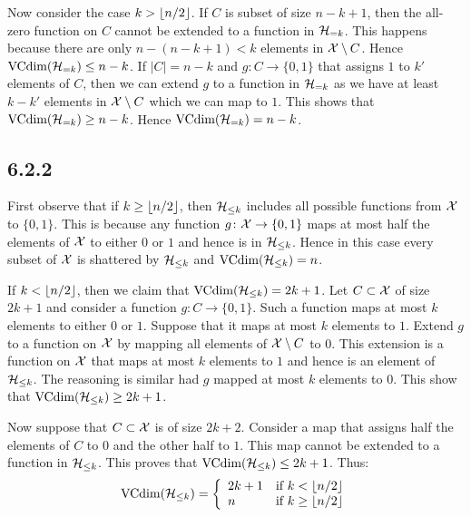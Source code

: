 Now consider the case $k > \left \lfloor n / 2 \right \rfloor$. If $C$ is subset of size
$n - k + 1$, then the all-zero function on $C$ cannot be extended
to a function in $\mathcal{H}_{= k}$. This happens because there are only
$n - (n - k + 1) < k$ elements in $\mathcal{X} \setminus C$. Hence
$\text{VCdim}(\mathcal{H}_{= k}) \leq n - k$. If $|C| = n - k$ and
$g \colon C \rightarrow \{0, 1\}$ that assigns $1$ to $k'$
elements of $C$, then we can extend $g$ to a function in
$\mathcal{H}_{= k}$ as we have at least $k - k'$ elements in
$\mathcal{X} \setminus C$ which we can map to $1$. This shows that
$\text{VCdim}(\mathcal{H}_{= k}) \geq n - k$. Hence
$\text{VCdim}(\mathcal{H}_{= k}) = n - k$.

\subsection*{6.2.2}

First observe that if $k \geq \left \lfloor n / 2 \right \rfloor$, then $\mathcal{H}_{\leq k}$ includes
all possible functions from $\mathcal{X}$ to $\{0, 1\}$. This is because any function
$g \colon \mathcal{X} \rightarrow \{0, 1\}$ maps at most half the elements of
$\mathcal{X}$ to either $0$ or $1$ and hence is in $\mathcal{H}_{\leq k}$.
Hence in this case every subset of $\mathcal{X}$ is shattered by $\mathcal{H}_{\leq k}$
and $\text{VCdim} (\mathcal{H}_{\leq k}) = n$.

If $k < \left \lfloor n / 2 \right \rfloor$, then we claim that  $\text{VCdim} (\mathcal{H}_{\leq k}) = 2k + 1$.
Let $C \subset \mathcal{X}$ of size $2k + 1$ and consider a function
$g \colon C \rightarrow \{0, 1\}$. Such a function maps at most $k$ elements
to either $0$ or $1$. Suppose that it maps at most $k$ elements to $1$. Extend
$g$ to a function on $\mathcal{X}$ by mapping all elements of $\mathcal{X} \setminus C$ to $0$.
This extension is a function on $\mathcal{X}$ that maps at most $k$ elements to $1$
and hence is an element of $\mathcal{H}_{\leq k}$. The reasoning is similar had $g$
mapped at most $k$ elements to $0$. This show that
$\text{VCdim}(\mathcal{H}_{\leq k}) \geq 2k + 1$.

Now suppose that $C \subset \mathcal{X}$ is of size $2k + 2$. Consider a map
that assigns half the elements of $C$ to $0$ and the other half to $1$.
This map cannot be extended to a function in $\mathcal{H}_{\leq k}$. This
proves that $\text{VCdim} (\mathcal{H}_{\leq k}) \leq 2k + 1$. Thus:
\[\text{VCdim}(\mathcal{H}_{\leq k})
= \left \{ \begin{array}{ll}
                2k + 1  & \text{if } k < \left \lfloor n / 2 \right \rfloor \\
                n       & \text{if } k \geq \left \lfloor n / 2 \right \rfloor
           \end{array} \right .
\]

